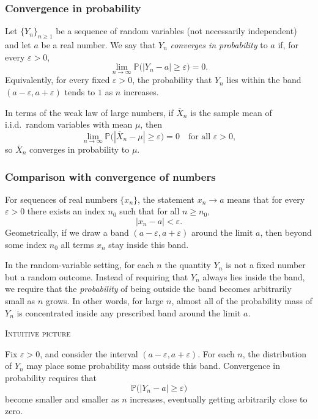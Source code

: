 \subsubsection{Convergence in probability}

Let \(\{Y_n\}_{n \ge 1}\) be a sequence of random variables (not necessarily independent) and let \(a\) be a real number.  
We say that \(Y_n\) \textit{converges in probability} to \(a\) if, for every \(\varepsilon > 0\),
\[
\lim_{n \to \infty} \mathbb{P}\big(|Y_n - a| \ge \varepsilon\big) = 0.
\]
Equivalently, for every fixed \(\varepsilon > 0\), the probability that \(Y_n\) lies within the band \((a - \varepsilon, a + \varepsilon)\) tends to \(1\) as \(n\) increases.  

In terms of the weak law of large numbers, if \(\overline{X}_n\) is the sample mean of i.i.d.\ random variables with mean \(\mu\), then
\[
\lim_{n \to \infty} \mathbb{P}\big(|\overline{X}_n - \mu| \ge \varepsilon\big) = 0
\quad\text{for all } \varepsilon > 0,
\]
so \(\overline{X}_n\) converges in probability to \(\mu\).  

\subsubsection{Comparison with convergence of numbers}

For sequences of real numbers \(\{x_n\}\), the statement \(x_n \to a\) means that for every \(\varepsilon > 0\) there exists an index \(n_0\) such that for all \(n \ge n_0\),
\[
|x_n - a| < \varepsilon.
\]
Geometrically, if we draw a band \((a - \varepsilon, a + \varepsilon)\) around the limit \(a\), then beyond some index \(n_0\) all terms \(x_n\) stay inside this band.  

In the random-variable setting, for each \(n\) the quantity \(Y_n\) is not a fixed number but a random outcome.  
Instead of requiring that \(Y_n\) always lies inside the band, we require that the \textit{probability} of being outside the band becomes arbitrarily small as \(n\) grows.  
In other words, for large \(n\), almost all of the probability mass of \(Y_n\) is concentrated inside any prescribed band around the limit \(a\).  

\bigskip
\textsc{Intuitive picture}

Fix \(\varepsilon > 0\), and consider the interval \((a - \varepsilon, a + \varepsilon)\).  
For each \(n\), the distribution of \(Y_n\) may place some probability mass outside this band.  
Convergence in probability requires that
\[
\mathbb{P}\big(|Y_n - a| \ge \varepsilon\big)
\]
become smaller and smaller as \(n\) increases, eventually getting arbitrarily close to zero.  

